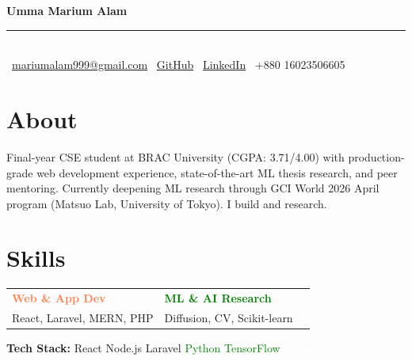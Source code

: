 \documentclass[11pt,a4paper]{article}
\begin{document}
\begin{center}
    {\color{white}\Huge\bfseries\sffamily Umma Marium Alam} \\[4pt]
    {\color{coral}\rule{0.4\textwidth}{1pt}} \\[6pt]
    {\color{muted}\large
        \faEnvelope\ \href{mailto:mariumalam999@gmail.com}{mariumalam999@gmail.com} \quad
        \textbullet \quad
        \faGithub\ \href{https://github.com/UmmaMariumAlam}{GitHub} \quad
        \textbullet \quad
        \faLinkedin\ \href{https://linkedin.com/in/umma-marium-alam}{LinkedIn} \quad
        \textbullet \quad
        \faPhone\ +880 16023506605
    }
\end{center}

\vspace{6pt}

\section{About}
\begin{tcolorbox}[colback=navy2, coltext=white, colframe=coral, borderline west={4pt}{0pt}{coral}, arc=2mm, boxrule=0.5pt, left=8pt, right=8pt, top=7pt, bottom=7pt]
    Final-year CSE student at BRAC University (CGPA: 3.71/4.00) with production-grade web development experience, state-of-the-art ML thesis research, and peer mentoring. Currently deepening ML research through GCI World 2026 April program (Matsuo Lab, University of Tokyo). I build and research.
\end{tcolorbox}

\section{Skills}
\vspace{-4pt}
\begin{tabularx}{\textwidth}{X X X}
    \textcolor{coral}{\textbf{Web \& App Dev}} & \textcolor{green}{\textbf{ML \& AI Research}} \\
    React, Laravel, MERN, PHP & Diffusion, CV, Scikit-learn 
\end{tabularx}

\vspace{8pt}
\textbf{\textcolor{muted}{Tech Stack:}} 
\textcolor{coral2}{React} \textbullet{} \textcolor{coral2}{Node.js} \textbullet{} \textcolor{coral2}{Laravel} \textbullet{} 
\textcolor{green}{Python} \textbullet{} \textcolor{green}{TensorFlow} \textbullet{} 
\textcolor{white}{MongoDB} \textbullet{} \textcolor{white}{MySQL}
\end{document}
